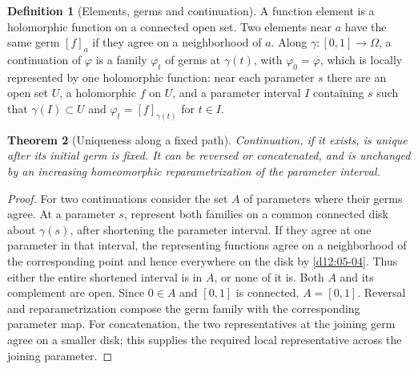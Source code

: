 \documentclass[11pt,a4paper,openany]{book}
\newtheorem{theorem}{Theorem}[chapter]
\theoremstyle{definition}
\newtheorem{definition}[theorem]{Definition}
\theoremstyle{remark}\newtheorem{remark}[theorem]{Remark}
\newcommand{\family}[1]{}
\begin{document}
\begin{definition}[Elements, germs and continuation]\label{d12:19-01}\family{D12.19.01}
A function element is a holomorphic function on a connected open set. Two
elements near $a$ have the same germ $[f]_a$ if they agree on a neighborhood
of $a$. Along $\gamma:[0,1]\to\Omega$, a continuation of $\varphi$ is a
family $\varphi_t$ of germs at $\gamma(t)$, with $\varphi_0=\varphi$, which
is locally represented by one holomorphic function: near each parameter $s$
there are an open set $U$, a holomorphic $f$ on $U$, and a parameter interval
$I$ containing $s$ such that $\gamma(I)\subset U$ and
$\varphi_t=[f]_{\gamma(t)}$ for $t\in I$.
\end{definition}

\begin{theorem}[Uniqueness along a fixed path]\label{d12:19:uniqueness}
Continuation, if it exists, is unique after its initial germ is fixed.
It can be reversed or concatenated, and is unchanged by an increasing
homeomorphic reparametrization of the parameter interval.
\end{theorem}
\begin{proof}
For two continuations consider the set $A$ of parameters where their germs
agree. At a parameter $s$, represent both families on a common connected
disk about $\gamma(s)$, after shortening the parameter interval. If they
agree at one parameter in that interval, the representing functions agree
on a neighborhood of the corresponding point and hence everywhere on the
disk by \cref{d12:05-04}. Thus either the entire shortened interval is in
$A$, or none of it is. Both $A$ and its complement are open. Since $0\in A$
and $[0,1]$ is connected, $A=[0,1]$. Reversal and reparametrization compose
the germ family with the corresponding parameter map. For concatenation,
the two representatives at the joining germ agree on a smaller disk; this
supplies the required local representative across the joining parameter.
\end{proof}
\end{document}
